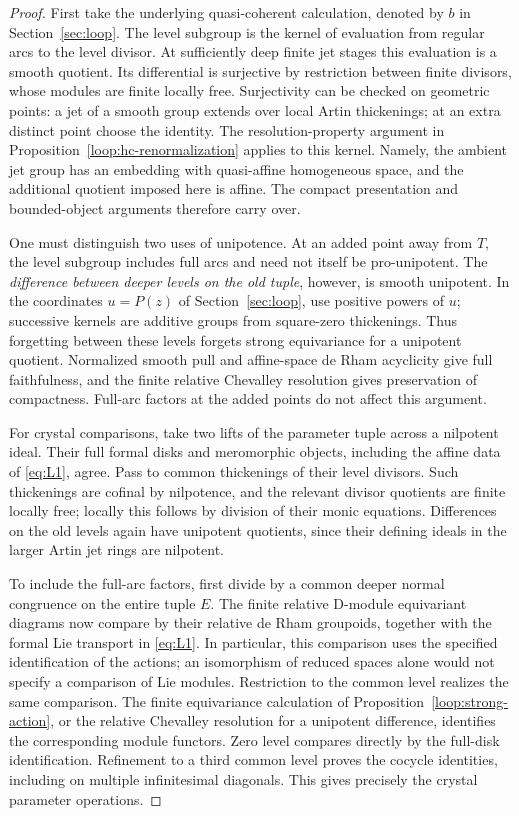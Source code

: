 \begin{proof}
First take the underlying quasi-coherent calculation, denoted by $b$ in
Section~\ref{sec:loop}.  The level subgroup is the kernel of evaluation
from regular arcs to the level divisor.  At sufficiently deep finite
jet stages this evaluation is a smooth quotient.  Its differential is
surjective by restriction between finite divisors, whose modules are
finite locally free.  Surjectivity can be checked on geometric points:
a jet of a smooth group extends over local Artin thickenings; at an
extra distinct point choose the identity.  The resolution-property
argument in Proposition~\ref{loop:hc-renormalization} applies to this kernel.  Namely, the ambient
jet group has an embedding with quasi-affine homogeneous space, and
the additional quotient imposed here is affine.  The compact
presentation and bounded-object arguments therefore carry over.

One must distinguish two uses of unipotence.  At an added point away
from $T$, the level subgroup includes full arcs and need not itself be
pro-unipotent.  The \emph{difference between deeper levels on the old
tuple}, however, is smooth unipotent.  In the coordinates
$u=P(z)$ of Section~\ref{sec:loop}, use positive powers of $u$; successive
kernels are additive groups from square-zero thickenings.  Thus
forgetting between these levels forgets strong equivariance for a
unipotent quotient.  Normalized smooth pull and affine-space de Rham
acyclicity give full faithfulness, and the finite relative Chevalley
resolution gives preservation of compactness.  Full-arc factors at the
added points do not affect this argument.

For crystal comparisons, take two lifts of the parameter tuple across
a nilpotent ideal.  Their full formal disks and meromorphic objects,
including the affine data of \eqref{eq:L1}, agree.  Pass to common
thickenings of their level divisors.  Such thickenings are cofinal by
nilpotence, and the relevant divisor quotients are finite locally free;
locally this follows by division of their monic equations.  Differences
on the old levels again have unipotent quotients, since their defining
ideals in the larger Artin jet rings are nilpotent.

To include the full-arc factors, first divide by a common deeper normal
congruence on the entire tuple $E$.  The finite relative D-module
equivariant diagrams now compare by their relative de Rham groupoids,
together with the formal Lie transport in \eqref{eq:L1}.  In particular,
this comparison uses the specified identification of the actions; an
isomorphism of reduced spaces alone would not specify a comparison of
Lie modules.  Restriction to the common level realizes the same
comparison.  The finite equivariance calculation of
Proposition~\ref{loop:strong-action}, or
the relative Chevalley resolution for a unipotent difference, identifies
the corresponding module functors.  Zero level compares directly by
the full-disk identification.  Refinement to a third common level
proves the cocycle identities, including on multiple infinitesimal
diagonals.  This gives precisely the crystal parameter operations.
\end{proof}

